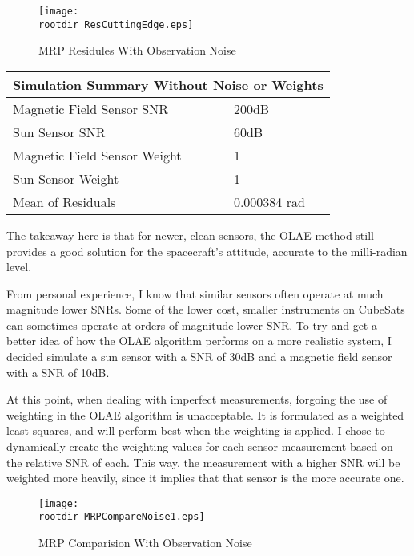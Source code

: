 \documentclass[11pt]{aiaa-tc}%
\newcommand{\rootdir}{./Figures/}
\begin{document}
\begin{centering}
	\begin{figure}[Hh]
		\texttt{[image: \\rootdir ResCuttingEdge.eps]}
		\caption{MRP Residules With Observation Noise}
		\label{fig:Res Noise}
	\end{figure}
\end{centering}

\begin{center}
\label{table:Simulation No Noise}
\begin{tabular}{ |l|l| }
  \hline
	  \multicolumn{2}{|c|}{Simulation Summary Without Noise or Weights} \\
	  \hline
	  Magnetic Field Sensor SNR & 200dB \\
	  Sun Sensor SNR & 60dB \\
	  Magnetic Field Sensor Weight & 1 \\
	  Sun Sensor Weight & 1 \\
	  Mean of Residuals & 0.000384 rad\\
	  \hline
	\end{tabular}
\end{center}

The takeaway here is that for newer, clean sensors, the OLAE method still provides a good solution for the spacecraft's attitude, accurate to the milli-radian level. 

From personal experience, I know that similar sensors often operate at much magnitude lower SNRs. Some of the lower cost, smaller instruments on CubeSats can sometimes operate at orders of magnitude lower SNR. To try and get a better idea of how the OLAE algorithm performs on a more realistic system, I decided simulate a sun sensor with a SNR of 30dB and a magnetic field sensor with a SNR of 10dB.

At this point, when dealing with imperfect measurements, forgoing the use of weighting in the OLAE algorithm is unacceptable. It is formulated as a weighted least squares, and will perform best when the weighting is applied. I chose to dynamically create the weighting values for each sensor measurement based on the relative SNR of each. This way, the measurement with a higher SNR will be weighted more heavily, since it implies that that sensor is the more accurate one. 

\begin{centering}
	\begin{figure}[Hh]
		\texttt{[image: \\rootdir MRPCompareNoise1.eps]}
		\caption{MRP Comparision With Observation Noise}
		\label{fig:MRP Noise}
	\end{figure}
\end{centering}
\end{document}
